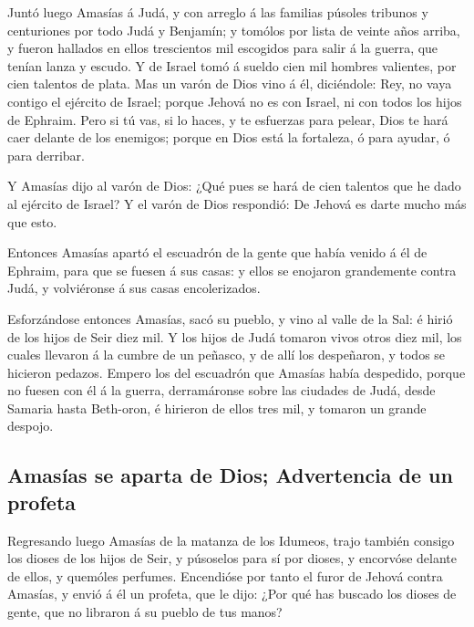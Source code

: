  Juntó luego Amasías á Judá, y con arreglo á las familias
púsoles tribunos y centuriones por todo Judá y Benjamín; y tomólos por
lista de veinte años arriba, y fueron hallados en ellos trescientos mil
escogidos para salir á la guerra, que tenían lanza y escudo.
 Y de Israel tomó á sueldo cien mil hombres valientes, por
cien talentos de plata.  Mas un varón de Dios vino á él,
diciéndole: Rey, no vaya contigo el ejército de Israel; porque Jehová no
es con Israel, ni con todos los hijos de Ephraim.  Pero si
tú vas, si lo haces, y te esfuerzas para pelear, Dios te hará caer
delante de los enemigos; porque en Dios está la fortaleza, ó para
ayudar, ó para derribar.

 Y Amasías dijo al varón de Dios: ¿Qué pues se hará de cien
talentos que he dado al ejército de Israel? Y el varón de Dios
respondió: De Jehová es darte mucho más que esto.

 Entonces Amasías apartó el escuadrón de la gente que había
venido á él de Ephraim, para que se fuesen á sus casas: y ellos se
enojaron grandemente contra Judá, y volviéronse á sus casas
encolerizados.

 Esforzándose entonces Amasías, sacó su pueblo, y vino al
valle de la Sal: é hirió de los hijos de Seir diez mil.  Y
los hijos de Judá tomaron vivos otros diez mil, los cuales llevaron á la
cumbre de un peñasco, y de allí los despeñaron, y todos se hicieron
pedazos.  Empero los del escuadrón que Amasías había
despedido, porque no fuesen con él á la guerra, derramáronse sobre las
ciudades de Judá, desde Samaria hasta Beth-oron, é hirieron de ellos
tres mil, y tomaron un grande despojo.

\hypertarget{amasuxedas-se-aparta-de-dios-advertencia-de-un-profeta}{%
\subsection{Amasías se aparta de Dios; Advertencia de un
profeta}\label{amasuxedas-se-aparta-de-dios-advertencia-de-un-profeta}}

 Regresando luego Amasías de la matanza de los Idumeos,
trajo también consigo los dioses de los hijos de Seir, y púsoselos para
sí por dioses, y encorvóse delante de ellos, y quemóles perfumes.
 Encendióse por tanto el furor de Jehová contra Amasías, y
envió á él un profeta, que le dijo: ¿Por qué has buscado los dioses de
gente, que no libraron á su pueblo de tus manos?


